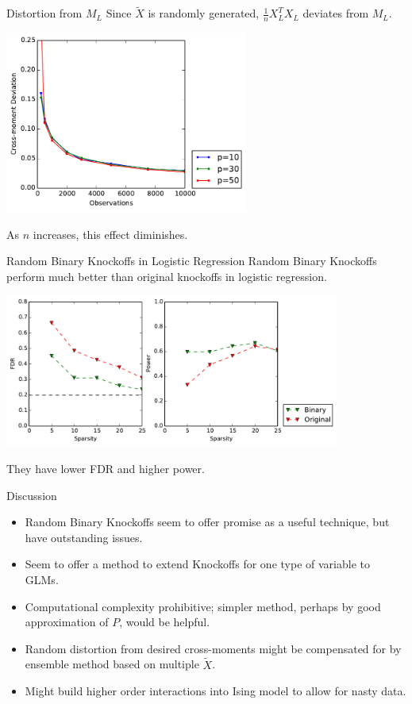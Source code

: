\documentclass{beamer}
\begin{document}
\begin{frame}{Distortion from $M_L$}
    Since $\tilde X$ is randomly generated, $\frac{1}{n}X_L^TX_L$ deviates from $M_L$.
    \begin{center}
        \includegraphics[width=8cm]{images/sigma_fit}
    \end{center}
    As $n$ increases, this effect diminishes. 
\end{frame}

\begin{frame}{Random Binary Knockoffs in Logistic Regression}
    Random Binary Knockoffs perform much better than original knockoffs in logistic regression.
    \begin{center}
        \includegraphics[width=11cm]{images/logit_FDR_power_50}
    \end{center}
    They have lower FDR and higher power.
\end{frame}

\begin{frame}{Discussion}
    \begin{itemize}
        \item Random Binary Knockoffs seem to offer promise as a useful technique, but have outstanding issues.
        \item Seem to offer a method to extend Knockoffs for one type of variable to GLMs.
        \item Computational complexity prohibitive; simpler method, perhaps by good approximation of $P$, would be helpful.
        \item Random distortion from desired cross-moments might be compensated for by ensemble method based on multiple $\tilde X$.
        \item Might build higher order interactions into Ising model to allow for nasty data.
    \end{itemize}
\end{frame}
\end{document}
